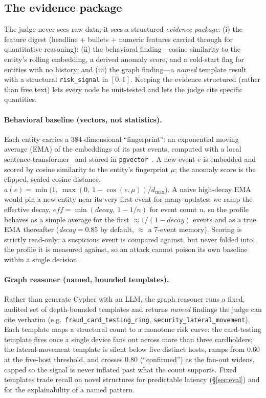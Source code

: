 \documentclass[sigconf,nonacm,screen]{acmart}
\newcommand{\us}{\_\allowbreak}   %
\begin{document}
\subsection{The evidence package}

The judge never sees raw data; it sees a structured \emph{evidence package}:
(i) the feature digest (headline + bullets + numeric features carried through for
quantitative reasoning); (ii) the behavioral finding---cosine similarity to the
entity's rolling embedding, a derived anomaly score, and a cold-start flag for
entities with no history; and (iii) the graph finding---a \emph{named} template
result with a structural \texttt{risk\_signal} in $[0,1]$. Keeping the evidence
structured (rather than free text) lets every node be unit-tested and lets the
judge cite specific quantities.

\paragraph{Behavioral baseline (vectors, not statistics).}
Each entity carries a 384-dimensional ``fingerprint'': an exponential moving
average (EMA) of the embeddings of its past events, computed with a local
sentence-transformer~\cite{reimers2019sbert} and stored in
\texttt{pgvector}~\cite{pgvector}. A new event $e$ is embedded and scored by
cosine similarity to the entity's fingerprint $\mu$; the anomaly score is the
clipped, scaled cosine distance,
$a(e) = \min\!\big(1,\ \max(0,\ 1-\cos(e,\mu))/d_{\max}\big)$.
A naive high-decay EMA would pin a new entity near its very first event for many
updates; we ramp the effective decay, $\textit{eff} = \min(\textit{decay},\ 1 -
1/n)$ for event count $n$, so the profile behaves as a simple average for the
first $\approx 1/(1-\textit{decay})$ events and as a true EMA thereafter
(\textit{decay}$=0.85$ by default, $\approx$ a 7-event memory). Scoring is
strictly read-only: a suspicious event is compared against, but never folded
into, the profile it is measured against, so an attack cannot poison its own
baseline within a single decision.

\paragraph{Graph reasoner (named, bounded templates).}
Rather than generate Cypher with an LLM, the graph reasoner runs a fixed,
audited set of depth-bounded templates and returns \emph{named} findings the
judge can cite verbatim (e.g.\ \texttt{fraud\us card\us testing\us ring},
\texttt{security\us lateral\us movement}). Each template maps a structural count to a
monotone risk curve: the card-testing template fires once a single device fans
out across more than three cardholders; the lateral-movement template is silent
below five distinct hosts, ramps from $0.60$ at the five-host threshold, and
crosses $0.80$ (``confirmed'') as the fan-out widens, capped so the signal is
never inflated past what the count supports. Fixed templates trade recall on
novel structures for predictable latency (\S\ref{sec:eval}) and for the
explainability of a named pattern.
\end{document}
